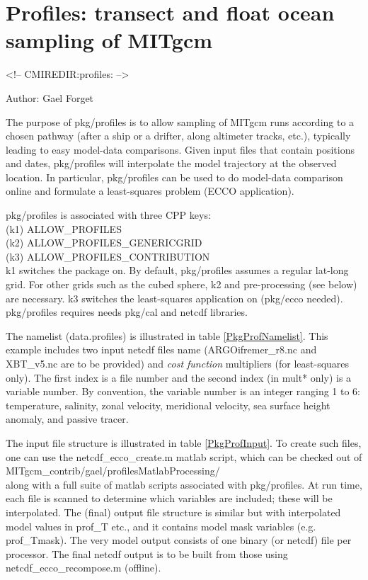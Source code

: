 \section{Profiles: transect and float ocean sampling of MITgcm
\label{sectionprofiles}}
\begin{rawhtml}
<!-- CMIREDIR:profiles: -->
\end{rawhtml}

Author: Gael Forget

\bigskip

The purpose of pkg/profiles is to allow sampling of MITgcm runs according to a chosen pathway (after a ship or a drifter, along altimeter tracks, etc.), typically leading to easy model-data comparisons. Given input files that contain positions and dates, pkg/profiles will interpolate the model trajectory at the observed location. In particular, pkg/profiles can be used to do model-data comparison online and formulate a least-squares problem (ECCO application). 

\bigskip

pkg/profiles is associated with three CPP keys: \\ 
 (k1) ALLOW\_PROFILES \\
 (k2) ALLOW\_PROFILES\_GENERICGRID \\
 (k3) ALLOW\_PROFILES\_CONTRIBUTION \\
k1 switches the package on. By default, pkg/profiles assumes a regular lat-long grid. For other grids such as the cubed sphere, k2 and pre-processing (see below) are necessary. k3 switches the least-squares application on (pkg/ecco needed). pkg/profiles requires needs pkg/cal and netcdf libraries. 

\bigskip

The namelist (data.profiles) is illustrated in table \ref{PkgProfNamelist}. This example includes two input netcdf files name (ARGOifremer\_r8.nc and XBT\_v5.nc are to be provided) and {\it cost function} multipliers (for least-squares only). The first index is a file number and the second index (in mult* only) is a variable number. By convention, the variable number is an integer ranging 1 to 6: temperature, salinity, zonal velocity, meridional velocity, sea surface height anomaly, and passive tracer. 

\bigskip

The input file structure is illustrated in table \ref{PkgProfInput}. To create such files, one can use the netcdf\_ecco\_create.m matlab script, which can be checked out of \\ 
MITgcm\_contrib/gael/profilesMatlabProcessing/ \\
along with a full suite of matlab scripts associated with pkg/profiles. At run time, each file is scanned to determine which variables are included; these will be interpolated. The (final) output file structure is similar but with interpolated model values in prof\_T etc., and it contains model mask variables (e.g. prof\_Tmask). The very model output consists of one binary (or netcdf) file per processor. The final netcdf output is to be built from those using netcdf\_ecco\_recompose.m (offline).

